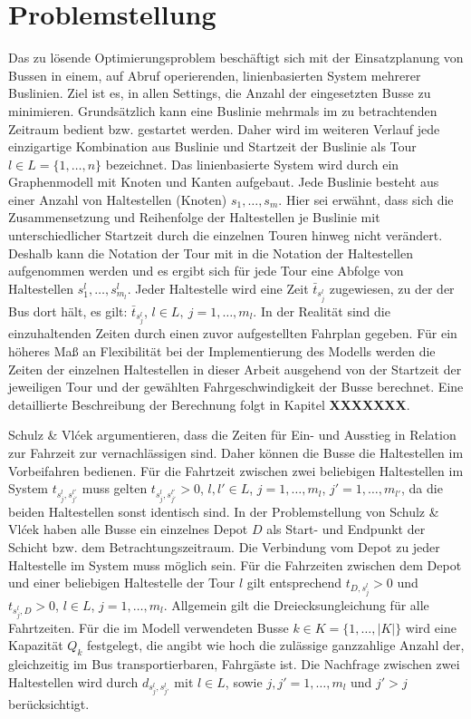 \chapter{Problemstellung}
\label{chapter:3}
\label{chapter:Problemstellung}
Das zu lösende Optimierungsproblem beschäftigt sich mit der Einsatzplanung von Bussen in einem, auf Abruf operierenden, linienbasierten System mehrerer Buslinien. Ziel ist es, in allen Settings, die Anzahl der eingesetzten Busse zu minimieren.
Grundsätzlich kann eine Buslinie mehrmals im zu betrachtenden Zeitraum bedient bzw. gestartet werden. 
Daher wird im weiteren Verlauf jede einzigartige Kombination aus Buslinie und Startzeit der Buslinie als Tour \( l \in L = \{1,  \dots , n\} \) bezeichnet. 
Das linienbasierte System wird durch ein Graphenmodell mit Knoten und Kanten aufgebaut. Jede Buslinie besteht aus einer Anzahl von Haltestellen (Knoten) $s_1, \dots, s_{m}$. Hier sei erwähnt, dass sich die Zusammensetzung und Reihenfolge der Haltestellen je Buslinie mit unterschiedlicher Startzeit durch die einzelnen Touren hinweg nicht verändert. Deshalb kann die Notation der Tour mit in die Notation der Haltestellen aufgenommen werden und es ergibt sich für jede Tour eine Abfolge von Haltestellen $s^l_1,  \dots , s^l_{m_l}$.
Jeder Haltestelle wird eine Zeit $\bar{t}_{s^l_j}$ zugewiesen, zu der der Bus dort hält, es gilt: $\bar{t}_{s^l_j}$, $l \in L,\ j = 1, \dots, m_l$.
In der Realität sind die einzuhaltenden Zeiten durch einen zuvor aufgestellten Fahrplan gegeben. Für ein höheres Maß an Flexibilität bei der Implementierung des Modells werden die Zeiten der einzelnen Haltestellen in dieser Arbeit ausgehend von der Startzeit der jeweiligen Tour und der gewählten Fahrgeschwindigkeit der Busse berechnet. Eine detaillierte Beschreibung der Berechnung folgt in Kapitel \textbf{XXXXXXX}.


Schulz \& Vlćek argumentieren, dass die Zeiten für Ein- und Ausstieg in Relation zur Fahrzeit zur vernachlässigen sind. Daher können die Busse die Haltestellen im Vorbeifahren bedienen.
Für die Fahrtzeit zwischen zwei beliebigen Haltestellen im System $t_{s^l_j, s^{l'}_{j'}}$ muss gelten $t_{s^l_j, s^{l'}_{j'}}> 0$, $l, l' \in L$, $j = 1, \dots, m_l$, $j' = 1, \dots, m_{l'}$, da die beiden Haltestellen sonst identisch sind.
In der Problemstellung von Schulz \& Vlćek haben alle Busse ein einzelnes Depot $D$ als Start- und Endpunkt der Schicht bzw. dem Betrachtungszeitraum. Die Verbindung vom Depot zu jeder Haltestelle im System muss möglich sein. Für die Fahrzeiten zwischen dem Depot und einer beliebigen Haltestelle der Tour $l$ gilt entsprechend $t_{D, s^l_j} > 0$ und $t_{s^l_j, D} > 0$, $l \in L$, $j = 1, \dots, m_l$. Allgemein gilt die Dreiecksungleichung für alle Fahrtzeiten.
Für die im Modell verwendeten Busse $k \in K = \{1, \dots, |K|\}$ wird eine Kapazität $Q_k$ festgelegt, die angibt wie hoch die zulässige ganzzahlige Anzahl der, gleichzeitig im Bus transportierbaren, Fahrgäste ist.
Die Nachfrage zwischen zwei Haltestellen wird durch $d_{s^l_j, s^l_{j'}}$ mit $l \in L$, sowie $j, j' = 1, \dots, m_l$ und $j' > j$ berücksichtigt.


